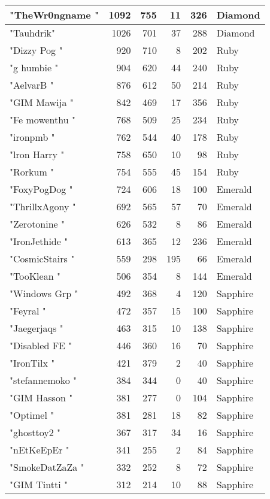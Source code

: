 \documentclass{article}
\begin{document}
\begin{table}[htbp]
\begin{tabular}{|l|r|r|r|r|l|}
"TheWr0ngname " & 1092 & 755 & 11 & 326 & Diamond \\ \hline
"Tauhdrik" & 1026 & 701 & 37 & 288 & Diamond \\ \hline
"Dizzy Pog " & 920 & 710 & 8 & 202 & Ruby \\ \hline
"g humbie " & 904 & 620 & 44 & 240 & Ruby \\ \hline
"AelvarB " & 876 & 612 & 50 & 214 & Ruby \\ \hline
"GIM Mawija " & 842 & 469 & 17 & 356 & Ruby \\ \hline
"Fe mowenthu " & 768 & 509 & 25 & 234 & Ruby \\ \hline
"ironpmb " & 762 & 544 & 40 & 178 & Ruby \\ \hline
"lron Harry " & 758 & 650 & 10 & 98 & Ruby \\ \hline
"Rorkum " & 754 & 555 & 45 & 154 & Ruby \\ \hline
"FoxyPogDog " & 724 & 606 & 18 & 100 & Emerald \\ \hline
"ThrillxAgony " & 692 & 565 & 57 & 70 & Emerald \\ \hline
"Zerotonine " & 626 & 532 & 8 & 86 & Emerald \\ \hline
"IronJethide " & 613 & 365 & 12 & 236 & Emerald \\ \hline
"CosmicStairs " & 559 & 298 & 195 & 66 & Emerald \\ \hline
"TooKlean " & 506 & 354 & 8 & 144 & Emerald \\ \hline
"Windows Grp " & 492 & 368 & 4 & 120 & Sapphire \\ \hline
"Feyral " & 472 & 357 & 15 & 100 & Sapphire \\ \hline
"Jaegerjaqs " & 463 & 315 & 10 & 138 & Sapphire \\ \hline
"Disabled FE " & 446 & 360 & 16 & 70 & Sapphire \\ \hline
"IronTilx " & 421 & 379 & 2 & 40 & Sapphire \\ \hline
"stefannemoko " & 384 & 344 & 0 & 40 & Sapphire \\ \hline
"GIM Hasson " & 381 & 277 & 0 & 104 & Sapphire \\ \hline
"Optimel " & 381 & 281 & 18 & 82 & Sapphire \\ \hline
"ghosttoy2 " & 367 & 317 & 34 & 16 & Sapphire \\ \hline
"nEtKeEpEr " & 341 & 255 & 2 & 84 & Sapphire \\ \hline
"SmokeDatZaZa " & 332 & 252 & 8 & 72 & Sapphire \\ \hline
"GIM Tintti " & 312 & 214 & 10 & 88 & Sapphire \\ \hline

\end{tabular}
\end{table}
\end{document}
